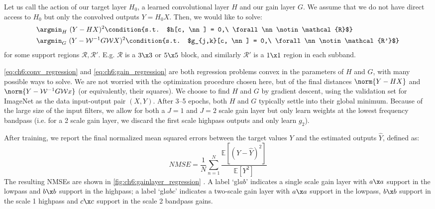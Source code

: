 Let us call the action of our target layer $H_0$, a learned convolutional layer $H$
and our gain layer $G$.
We assume that we do not have direct
access to $H_0$ but only the convolved outputs $Y=H_0 X$. Then, we would like to solve:
\begin{align}
  & \argmin_{H}\ (Y - HX)^2 %
  \condition{s.t. $h[c, \nn] = 0,\ \forall \nn \notin \mathcal{R}$} \label{eq:ch6:conv_regression}\\
  & \argmin_{G}\ (Y - \mathcal{W}^{-1}G\mathcal{W}X)^2 %
  \condition{s.t. $g_{j,k}[c, \nn] = 0,\ \forall \nn \notin \mathcal{R'}$} \label{eq:ch6:gain_regression}
\end{align}
for some support regions $\mathcal{R},\mathcal{R'}$. E.g. $\mathcal{R}$ is a $3\x3$ or $5\x5$
block, and similarly $\mathcal{R'}$ is a $1\x 1$ region in each
subband.

\eqref{eq:ch6:conv_regression} and \eqref{eq:ch6:gain_regression} are both
regression problems convex in the parameters of $H$ and $G$, with many possible
ways to solve. We are not worried with the optimization procedure chosen here,
but of the final distances $\norm{Y-HX}$ and $\norm{Y-\mathcal{W}^{-1}G\mathcal{W}x}$ (or
equivalently, their squares). We choose to find $H$ and $G$ by gradient descent,
using the validation set for ImageNet as the data input-output pair $(X, Y)$.
After 3--5 epochs, both $H$ and $G$ typically settle into their global minimum.
Because of the large size of the input filters, we allow for both a $J=1$ and
$J=2$ scale gain layer but only learn weights at the lowest frequency bandpass
(i.e. for a 2 scale gain layer, we discard the first scale highpass outputs and
only learn $g_2$).

After training, we report the final normalized mean squared errors between the
target values $Y$ and the estimated outputs $\hat{Y}$, defined as:
\begin{equation}
  NMSE = \frac{1}{N} \sum_{n=1}^N \frac{\mathbb{E}\left[(Y-\hat{Y})^2\right]}{\mathbb{E}\left[Y^2\right]}
\end{equation}
The resulting NMSEs are shown in \autoref{fig:ch6:gainlayer_regression} . A label
`gl$ab$' indicates a single scale gain layer with $a\x a$ support in the lowpass
and $b\x b$ support in the highpass; a label `gl$abc$' indicates a two-scale
gain layer with $a\x a$ support in the lowpass, $b\x b$ support in the scale 1
highpass and $c\x c$ support in the scale 2 bandpass gains.

